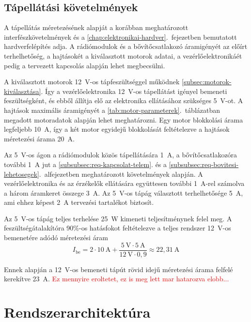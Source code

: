 \subsection{Tápellátási követelmények}
\label{subsec:req-aramfelvetel}
A tápellátás méretezésének alapját a korábban meghatározott
interfészkövetelmények és a \ref{chap:elektronikai-hardver}.~fejezetben
bemutatott hardverfelépítés adja. A rádiómodulok és a bővítőcsatlakozó
áramigényét az előírt terhelhetőség, a hajtásokét a kiválasztott
motorok adatai, a vezérlőelektronikáét pedig a tervezett kapcsolás
alapján lehet megbecsülni.

A kiválasztott motorok 12~V-os tápfeszültséggel működnek \ref{subsec:motorok-kiválasztása}.
Így a vezérlőelektronika 12~V-os tápellátást igényel bemeneti feszültségként, 
és ebből állítja elő az elektronika ellátásához szükséges 5~V-ot.
A hajtások maximális áramigényét a \ref{tab:motor-parameterek}.~táblázatban
megadott motoradatok alapján lehet meghatározni. Egy motor
blokkolási árama legfeljebb 10~A, így a két motor
egyidejű blokkolását feltételezve a hajtások méretezési árama
20~A.

Az 5~V-os ágon a rádiómodulok közös tápellátására 1~A, a
bővítőcsatlakozóra további 1~A jut a
\ref{subsubsec:req-kapcsolat-telem}. és a
\ref{subsubsec:req-bovitesi-lehetosegek}.~alfejezetben meghatározott
követelmények alapján. A vezérlőelektronika és az érzékelők
ellátására együttesen további 1~A-rel számolva a három áramkeret
összege 3~A. Az 5~V-os tápág választott terhelhetősége 5~A,
ami ehhez képest 2~A tervezési tartalékot biztosít.

Az 5~V-os tápág teljes terhelése 25~W kimeneti teljesítménynek
felel meg. A feszültségátalakítóra 90\%-os hatásfokot
feltételezve a teljes rendszer 12~V-os bemenetére adódó
méretezési áram
\begin{equation}
    I_{\mathrm{be}}
    = 2 \cdot 10~\mathrm{A}
    + \frac{5~\mathrm{V} \cdot 5~\mathrm{A}}
           {12~\mathrm{V} \cdot 0{,}9}
    \approx 22{,}31~\mathrm{A}
\end{equation}

Ennek alapján a 12~V-os bemeneti tápút rövid idejű
méretezési árama felfelé kerekítve 23~A.
\textcolor{red}{Ez mennyire eroltetet, ez is meg lett mar hatarozva elobb...}

\section{Rendszerarchitektúra}


